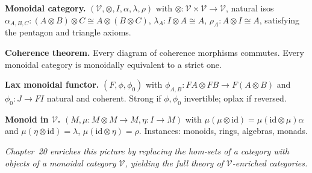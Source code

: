 \begin{formalrestatement}
\textbf{Monoidal category.} $(\mathcal{V}, \otimes, I, \alpha, \lambda, \rho)$
with $\otimes : \mathcal{V} \times \mathcal{V} \to \mathcal{V}$, natural isos
$\alpha_{A,B,C} : (A \otimes B) \otimes C \cong A \otimes (B \otimes C)$,
$\lambda_A : I \otimes A \cong A$, $\rho_A : A \otimes I \cong A$, satisfying
the pentagon and triangle axioms.

\medskip
\textbf{Coherence theorem.} Every diagram of coherence morphisms commutes.
Every monoidal category is monoidally equivalent to a strict one.

\medskip
\textbf{Lax monoidal functor.} $(F, \phi, \phi_0)$ with $\phi_{A,B} : FA
\otimes FB \to F(A \otimes B)$ and $\phi_0 : J \to FI$ natural and coherent.
Strong if $\phi, \phi_0$ invertible; oplax if reversed.

\medskip
\textbf{Monoid in $\mathcal{V}$.} $(M, \mu : M \otimes M \to M, \eta : I \to
M)$ with $\mu(\mu \otimes \mathrm{id}) = \mu(\mathrm{id} \otimes \mu)\alpha$
and $\mu(\eta \otimes \mathrm{id}) = \lambda$, $\mu(\mathrm{id} \otimes \eta)
= \rho$. Instances: monoids, rings, algebras, monads.

\medskip
\noindent\textit{Chapter~20 enriches this picture by replacing the hom-sets
of a category with objects of a monoidal category $\mathcal{V}$, yielding the
full theory of $\mathcal{V}$-enriched categories.}
\end{formalrestatement}
